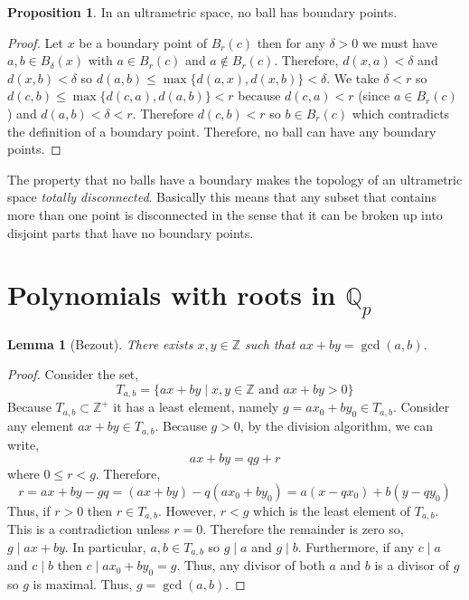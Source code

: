 \documentclass{article}
\newcommand{\divides}{\mid}
\newcommand{\Z}{\mathbb{Z}}
\newcommand{\Zplus}{\mathbb{Z}^{+}}
\newcommand{\ball}[2]{B_{#1} \! \left(#2 \right)}
\theoremstyle{theorem}
\newtheorem{lemma}[theorem]{Lemma}
\theoremstyle{definition}
\theoremstyle{definition}
\newtheorem*{proposition}{Proposition}
\theoremstyle{remark}
\theoremstyle{definition}
\theoremstyle{remark}
\begin{document}
\begin{proposition}
In an ultrametric space, no ball has boundary points.
\end{proposition}

\begin{proof}
Let $x$ be a boundary point of $\ball{r}{c}$ then for any $\delta > 0$ we must have $a,b \in \ball{\delta}{x}$ with $a \in \ball{r}{c}$ and $a \notin \ball{r}{c}$. Therefore, $d(x, a) < \delta$ and $d(x, b) < \delta$ so $d(a,b) \le \max\{d(a,x), d(x,b)\} < \delta$. We take $\delta < r$ so $d(c, b) \le \max\{d(c, a), d(a, b)\} < r$ because $d(c, a) < r$ (since $a \in \ball{r}{c}$) and $d(a,b) < \delta < r$. Therefore $d(c, b) < r$ so $b \in \ball{r}{c}$ which contradicts the definition of a boundary point. Therefore, no ball can have any boundary points. 
\end{proof}

The property that no balls have a boundary makes the topology of an ultrametric space \textit{totally disconnected}. Basically this means that any subset that contains more than one point is disconnected in the sense that it can be broken up into disjoint parts that have no boundary points. 

\section{Polynomials with roots in $\mathbb{Q}_p$}

\begin{lemma}[Bezout]
There exists $x, y \in \Z$ such that $ax + by = \gcd(a,b)$.
\end{lemma}

\begin{proof}
Consider the set, 
\[T_{a,b} = \{ax + by \mid x, y \in \Z \text{ and } ax + by > 0 \}\]
Because $T_{a,b} \subset \Zplus$ it has a least element, namely $g = ax_0 + by_0 \in T_{a,b}$. Consider any element $ax + by \in T_{a,b}$. Because $g > 0$, by the division algorithm, we can write,
\[ ax + by = qg + r\]
where $0 \le r < g$.
Therefore, 
\[r = ax + by - gq = (ax + by) - q(ax_0 + b y_0) = a(x - q x_0) + b (y - qy_0)\]
Thus, if $r > 0$ then $r \in T_{a,b}$. However, $r < g$ which is the least element of $T_{a,b}$. This is a contradiction unless $r = 0$. Therefore the remainder is zero so, $g \divides ax + by$.  In particular, $a,b \in T_{a,b}$ so $g \divides a$ and $g \divides b$. Furthermore, if any $c \divides a$ and $c \divides b$ then $c \divides ax_0 + b y_0 = g$. Thus, any divisor of both $a$ and $b$ is a divisor of $g$ so $g$ is maximal. Thus, $g = \gcd(a,b)$. 
\end{proof}
\end{document}

